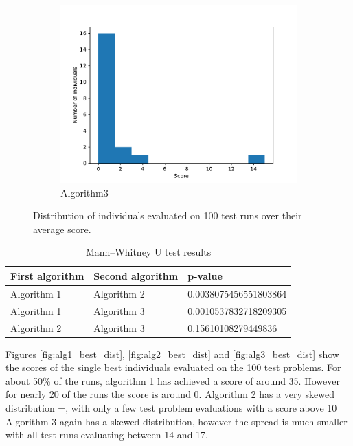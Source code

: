 \documentclass[12pt,a4paper]{article}
\begin{document}
\begin{figure}[h!]
\begin{subfigure}{.33\textwidth}
				\includegraphics[width=\linewidth]{../code/plots/alg3_bests_dist}
				\caption{Algorithm3}
				\label{fig:alg3_bests_dist}
			\end{subfigure}
			
			\caption{Distribution of individuals evaluated on 100 test runs over their average score.}
			\label{fig:bests_dist}
		\end{figure}
		
		
		\begin{table}[h!]
			\centering
			\begin{tabu} to \textwidth {|X[1l]|X[1l]|X[2l]|}
				\hline
				\textbf{First algorithm} & \textbf{Second algorithm} & \textbf{p-value} \\ \hline
				Algorithm 1 & Algorithm 2 & 0.0038075456551803864 \\ \hline
				Algorithm 1 & Algorithm 3 & 0.0010537832718209305 \\ \hline
				Algorithm 2 & Algorithm 3 & 0.15610108279449836   \\ \hline
			\end{tabu}
			
			\caption{Mann–Whitney U test results}
			\label{table:u-test}
		\end{table}	
		
		Figures \autoref{fig:alg1_best_dist}, \autoref{fig:alg2_best_dist} and \autoref{fig:alg3_best_dist} show the scores of the single best individuals evaluated on the 100 test problems. For about 50\% of the runs, algorithm 1 has achieved a score of around 35. However for nearly 20 of the runs the score is around 0. Algorithm 2 has a very skewed distribution =, with only a few test problem evaluations with a score above 10 Algorithm 3 again has a skewed distribution, however the spread is much smaller with all test runs evaluating between 14 and 17.
		
\end{document}
